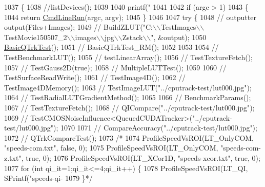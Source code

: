 \begin{DoxyCode}
1037 \{
1038     \textcolor{comment}{//listDevices();}
1039 
1040     printf(\textcolor{stringliteral}{"%
1041 
1042     \textcolor{keywordflow}{if} (argc > 1)
1043     \{
1044         \textcolor{keywordflow}{return} \hyperlink{test_8cu_acd967d59fdcafc56712132e13ff15f55}{CmdLineRun}(argc, argv);
1045     \}
1046 
1047     \textcolor{keywordflow}{try} \{
1048     \textcolor{comment}{//  outputter output(Files+Images);}
1049     \textcolor{comment}{//  BuildZLUT("C:\(\backslash\)\(\backslash\)TestImages\(\backslash\)\(\backslash\)TestMovie150507\_2\(\backslash\)\(\backslash\)images\(\backslash\)\(\backslash\)jpg\(\backslash\)\(\backslash\)Zstack\(\backslash\)\(\backslash\)", &output);}
1050         \hyperlink{test_8cu_a2b63751ab1973447f1bffc03497065d3}{BasicQTrkTest}();
1051     \textcolor{comment}{//  BasicQTrkTest\_RM();}
1052 
1053 
1054     \textcolor{comment}{//  TestBenchmarkLUT();}
1055     \textcolor{comment}{//  testLinearArray();}
1056     \textcolor{comment}{//  TestTextureFetch();}
1057     \textcolor{comment}{//  TestGauss2D(true);}
1058     \textcolor{comment}{//  MultipleLUTTest();}
1059 
1060     \textcolor{comment}{//  TestSurfaceReadWrite();}
1061     \textcolor{comment}{//  TestImage4D();}
1062     \textcolor{comment}{//  TestImage4DMemory();}
1063     \textcolor{comment}{//  TestImageLUT("../cputrack-test/lut000.jpg");}
1064     \textcolor{comment}{//  TestRadialLUTGradientMethod();}
1065         
1066     \textcolor{comment}{//  BenchmarkParams();}
1067     \textcolor{comment}{//  TestTextureFetch();}
1068     \textcolor{comment}{//  QICompare("../cputrack-test/lut000.jpg");}
1069     \textcolor{comment}{//  TestCMOSNoiseInfluence<QueuedCUDATracker>("../cputrack-test/lut000.jpg");}
1070 
1071     \textcolor{comment}{//  CompareAccuracy("../cputrack-test/lut000.jpg");}
1072     \textcolor{comment}{//  QTrkCompareTest();}
1073         \textcolor{comment}{/*}
1074 \textcolor{comment}{        ProfileSpeedVsROI(LT\_OnlyCOM, "speeds-com.txt", false, 0);}
1075 \textcolor{comment}{        ProfileSpeedVsROI(LT\_OnlyCOM, "speeds-com-z.txt", true, 0);}
1076 \textcolor{comment}{        ProfileSpeedVsROI(LT\_XCor1D, "speeds-xcor.txt", true, 0);}
1077 \textcolor{comment}{        for (int qi\_it=1;qi\_it<=4;qi\_it++) \{}
1078 \textcolor{comment}{            ProfileSpeedVsROI(LT\_QI, SPrintf("speeds-qi-%
1079 \textcolor{comment}{        \}*/}
}}
\end{DoxyCode}
